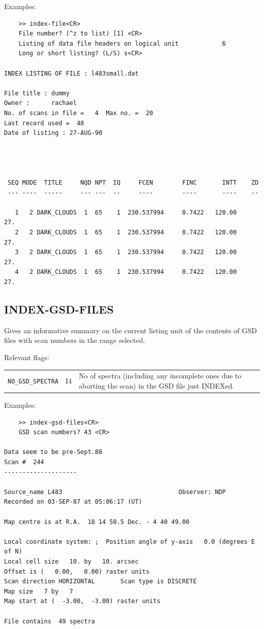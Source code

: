 \documentclass[11pt,twoside]{report}
\begin{document}
Examples:
\begin{verbatim}
    >> index-file<CR>
    File number? (^z to list) [1] <CR>
    Listing of data file headers on logical unit            6
    Long or short listing? (L/S) s<CR>

INDEX LISTING OF FILE : l483small.dat                           

File title : dummy                                   
Owner :      rachael     
No. of scans in file =   4  Max no. =  20
Last record used =  48
Date of listing : 27-AUG-90




 SEQ MODE  TITLE     NQD NPT  IQ     FCEN        FINC       INTT    ZD
 --- ----  -----     --- ---  --     ----        ----       ----    --

   1   2 DARK_CLOUDS  1  65    1  230.537994     0.7422   120.00    27.
   2   2 DARK_CLOUDS  1  65    1  230.537994     0.7422   120.00    27.
   3   2 DARK_CLOUDS  1  65    1  230.537994     0.7422   120.00    27.
   4   2 DARK_CLOUDS  1  65    1  230.537994     0.7422   120.00    27.
\end{verbatim}

\subsection{INDEX-GSD-FILES} 

Gives an informative summary on the current listing unit of the contents
of GSD files with scan numbers in the range selected.

Relevant flags:\\
\begin{tabular}{lll}
  \verb+NO_GSD_SPECTRA+ & I4 & \parbox[t]{4in}
                               {No of spectra (including any incomplete
                                ones due to aborting the scan) in the 
                                GSD file just INDEXed.}
\end{tabular}

Examples:

\begin{verbatim}
    >> index-gsd-files<CR>
    GSD scan numbers? 43 <CR>

Data seem to be pre-Sept.88
Scan #  244
--------------------

Source_name L483                                Observer: NDP             
Recorded on 03-SEP-87 at 05:06:17 (UT)

Map centre is at R.A.  18 14 50.5 Dec. - 4 40 49.00

Local coordinate system: ;  Position angle of y-axis   0.0 (degrees E of N)
Local cell size   10. by   10. arcsec
Offset is (   0.00,   0.00) raster units
Scan direction HORIZONTAL       Scan type is DISCRETE        
Map size   7 by   7
Map start at (  -3.00,  -3.00) raster units

File contains  49 spectra
\end{verbatim}
\end{document}

